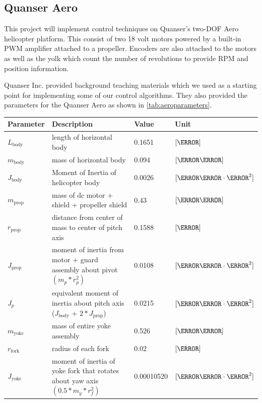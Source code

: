 \documentclass[letterpaper, 10pt, conference]{ieeeconf}
\begin{document}
\subsection{Quanser Aero}
This project will implement control techniques on Quanser's two-DOF Aero helicopter platform.  This consist of two 18 volt motors powered by a built-in PWM amplifier attached to a propeller.  \cite{quanserAeroUserManual}  Encoders are also attached to the motors as well as the yolk which count the number of revolutions to provide RPM and position information.

Quanser Inc. provided background teaching materials which we used as a starting point for implementing some of our control algorithms\cite{LQR_Lab_Guide}.  They also provided the parameters for the Quanser Aero as shown in \autoref{tab:aeroparameters}.
%
\begin{table}
    \centering
    \begin{tabular}{l|l|l|l}
        \toprule
        \textbf{Parameter} & \textbf{Description} & \textbf{Value} & \textbf{Unit}\\
        \toprule
        $L_{\text{body}}$ & length of horizontal body & 0.1651 & $[\meter]$ \\
        $m_{\text{body}}$ & mass of horizontal body & 0.094 & $[\kilo\gram]$ \\
        $J_{\text{body}}$ & Moment of Inertia of helicopter body & 0.0026 & $[\kilo\gram\cdot\meter^2]$ \\
        $m_{\text{prop}}$ & mass of dc motor + shield + propeller shield & $0.43$ & $[\kilo\gram]$ \\
        $r_{\text{prop}}$ & distance from center of mass to center of pitch axis & 0.1588 & $[\meter]$  \\
        $J_{\text{prop}}$ &  moment of inertia from motor + guard assembly about pivot $(m_p*r_p^2)$ & 0.0108 & $[\kilo\gram\cdot\meter^2]$ \\
        $J_p$ & equivalent moment of inertia about pitch axis ($J_{\text{body}}$ + $2*J_{\text{prop}}$) & 0.0215 & $[\kilo\gram\cdot\meter^2]$ \\
        $m_{\text{yoke}}$ & mass of entire yoke assembly & 0.526 & $[\kilo\gram]$ \\
        $r_{\text{fork}}$ & radius of each fork & 0.02 & $[\meter]$ \\
        $J_{\text{yoke}}$ & moment of inertia of yoke fork that rotates about yaw axis $(0.5*m_y*r_f^2)$ & 0.00010520 & $[\kilo\gram\cdot\meter^2]$ \\

\end{tabular}
\end{table}
\end{document}
